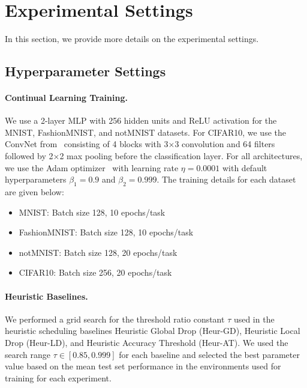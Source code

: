 
\section{Experimental Settings}\label{paperD:app:experimental_settings}

In this section, we provide more details on the experimental settings. 


\subsection{Hyperparameter Settings}

\paragraph{Continual Learning Training.} We use a 2-layer MLP with 256 hidden units and ReLU activation for the MNIST, FashionMNIST, and notMNIST datasets. For CIFAR10, we use the ConvNet from~ consisting of 4 blocks with 3$\times$3 convolution and 64 filters followed by 2$\times$2 max pooling before the classification layer. For all architectures, we use the Adam optimizer~ with learning rate $\eta = 0.0001$ with default hyperparameters $\beta_1=0.9$ and $\beta_2=0.999$. The training details for each dataset are given below:
\begin{itemize}
    \item MNIST: Batch size 128, 10 epochs/task
    \item FashionMNIST: Batch size 128, 10 epochs/task
    \item notMNIST: Batch size 128, 20 epochs/task
    \item CIFAR10: Batch size 256, 20 epochs/task
\end{itemize}

\paragraph{Heuristic Baselines.} We performed a grid search for the threshold ratio constant $\tau$ used in the heuristic scheduling baselines Heuristic Global Drop (Heur-GD), Heuristic Local Drop (Heur-LD), and Heuristic Accuracy Threshold (Heur-AT). We used the search range $\tau \in [0.85, 0.999]$ for each baseline and selected the best parameter value based on the mean test set performance in the environments used for training for each experiment.

